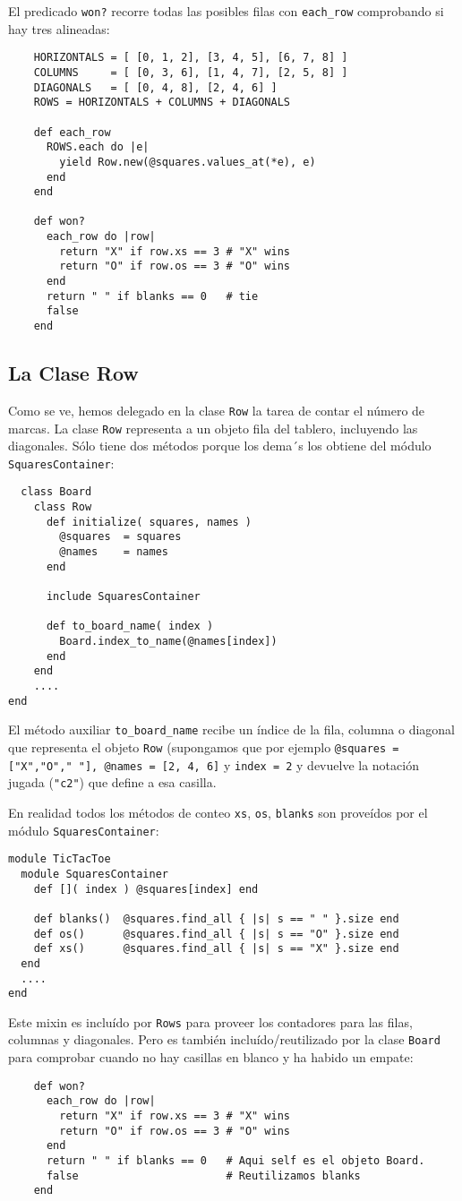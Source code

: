 El predicado  \verb|won?| recorre todas las posibles filas con \verb|each_row| comprobando 
si hay tres alineadas:

\begin{verbatim}
    HORIZONTALS = [ [0, 1, 2], [3, 4, 5], [6, 7, 8] ]
    COLUMNS     = [ [0, 3, 6], [1, 4, 7], [2, 5, 8] ]
    DIAGONALS   = [ [0, 4, 8], [2, 4, 6] ]
    ROWS = HORIZONTALS + COLUMNS + DIAGONALS

    def each_row
      ROWS.each do |e|
        yield Row.new(@squares.values_at(*e), e)
      end
    end

    def won?
      each_row do |row|
        return "X" if row.xs == 3 # "X" wins
        return "O" if row.os == 3 # "O" wins
      end
      return " " if blanks == 0   # tie
      false
    end
\end{verbatim}

\subsection{La Clase Row}
Como se ve, hemos delegado en la clase \verb|Row| la tarea de contar el número de marcas.
La clase \verb|Row| representa a un objeto fila del tablero, incluyendo las diagonales.
Sólo tiene dos métodos porque los dema´s los obtiene del módulo \verb|SquaresContainer|:
\begin{verbatim}
  class Board
    class Row
      def initialize( squares, names )
        @squares  = squares
        @names    = names
      end
      
      include SquaresContainer
      
      def to_board_name( index ) 
        Board.index_to_name(@names[index]) 
      end
    end
    .... 
end
\end{verbatim}
El método auxiliar \verb|to_board_name| recibe un índice de la fila, columna o diagonal que
representa el objeto \verb|Row| (supongamos que por ejemplo \verb|@squares = ["X","O"," "], @names = [2, 4, 6]| y \verb|index = 2|
y devuelve la notación jugada (\verb|"c2"|) que define a esa casilla.

En realidad todos los métodos de conteo \verb|xs|, \verb|os|, \verb|blanks| son proveídos por el módulo 
\verb|SquaresContainer|:
\begin{verbatim}
module TicTacToe
  module SquaresContainer
    def []( index ) @squares[index] end

    def blanks()  @squares.find_all { |s| s == " " }.size end
    def os()      @squares.find_all { |s| s == "O" }.size end
    def xs()      @squares.find_all { |s| s == "X" }.size end
  end
  .... 
end
\end{verbatim}
Este mixin es incluído por \verb|Rows| para proveer los contadores
para las filas, columnas y diagonales. Pero es también incluído/reutilizado por la clase
\verb|Board| para comprobar cuando no hay casillas en blanco y ha habido un empate:
\begin{verbatim}
    def won?
      each_row do |row|
        return "X" if row.xs == 3 # "X" wins
        return "O" if row.os == 3 # "O" wins
      end
      return " " if blanks == 0   # Aqui self es el objeto Board.
      false                       # Reutilizamos blanks
    end
\end{verbatim}

